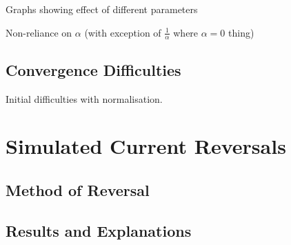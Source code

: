 Graphs showing effect of different parameters

Non-reliance on $\alpha$ (with exception of $\frac{1}{\alpha}$ where $\alpha = 0$ thing)

\subsection{Convergence Difficulties}

Initial difficulties with normalisation. 

\section{Simulated Current Reversals}

\subsection{Method of Reversal}

\subsection{Results and Explanations}

